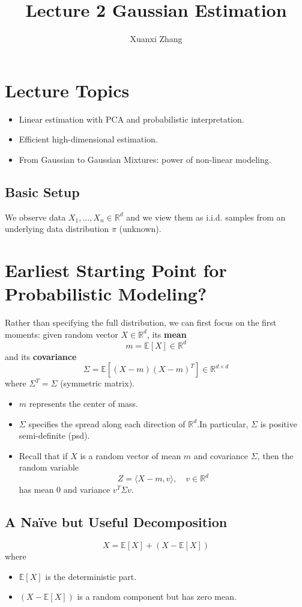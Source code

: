 \documentclass{article}
\title{Lecture 2 Gaussian Estimation}
\author{Xuanxi Zhang}
\date{}
\begin{document}
\maketitle

\section{Lecture Topics}
\begin{itemize}
    \item Linear estimation with PCA and probabilistic interpretation.
    \item Efficient high-dimensional estimation.
    \item From Gaussian to Gaussian Mixtures: power of non-linear modeling.
\end{itemize}

\subsection*{Basic Setup}
We observe data \( X_1, \dots, X_n \in \mathbb{R}^d \) and we view them as i.i.d. samples from an underlying data distribution \( \pi \) (unknown).

\section{Earliest Starting Point for Probabilistic Modeling?}
Rather than specifying the full distribution, we can first focus on the first moments: given random vector \( X \in \mathbb{R}^d \),
its \textbf{mean} 
\[
m = \mathbb{E}[X] \in \mathbb{R}^d
\]
and its \textbf{covariance} 
\[
\Sigma = \mathbb{E} \left[ (X - m)(X - m)^T \right] \in \mathbb{R}^{d \times d}
\]
where \( \Sigma^T = \Sigma \) (symmetric matrix).

\begin{itemize}
    \item \( m \) represents the center of mass.
    \item \( \Sigma \) specifies the spread along each direction of \( \mathbb{R}^d \).In particular, \( \Sigma \) is positive semi-definite (psd).
    \item Recall that if \( X \) is a random vector of mean \( m \) and covariance \( \Sigma \), then the random variable
    \[
    Z = \langle X - m, v \rangle, \quad v \in \mathbb{R}^d
    \]
    has mean \( 0 \) and variance \( v^T \Sigma v \).
\end{itemize}

\subsection*{A Naïve but Useful Decomposition}
\[
X = \mathbb{E}[X] + (X - \mathbb{E}[X])
\]
where
\begin{itemize}
    \item \( \mathbb{E}[X] \) is the deterministic part.
    \item \( (X - \mathbb{E}[X]) \) is a random component but has zero mean.
\end{itemize}
\end{document}
